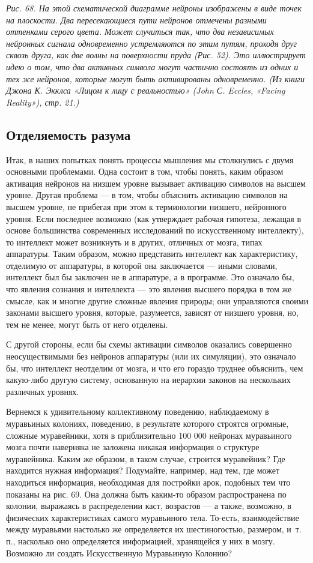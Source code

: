 \documentclass[../main.tex]{subfiles}
\begin{document}
\emph{Рис. 68. На этой схематической диаграмме нейроны изображены в виде точек на плоскости. Два пересекающиеся пути нейронов отмечены разными оттенками серого цвета. Может случиться так, что два независимых нейронных сигнала одновременно устремляются по этим путям, проходя друг сквозь друга, как две волны на поверхности пруда (Рис. 52). Это иллюстрирует идею о том, что два активных символа могут частично состоять из одних и тех же нейронов, которые могут быть активированы одновременно. (Из книги Джона К. Экклса «Лицом к лицу с реальностью» (John С. Eccles, «Facing Reality»), стр. 21.)}

\subsection{Отделяемость разума}

Итак, в наших попытках понять процессы мышления мы столкнулись с двумя основными проблемами. Одна состоит в том, чтобы понять, каким образом активация нейронов на низшем уровне вызывает активацию символов на высшем уровне. Другая проблема --- в том, чтобы объяснить активацию символов на высшем уровне, не прибегая при этом к терминологии низшего, нейронного уровня. Если последнее возможно (как утверждает рабочая гипотеза, лежащая в основе большинства современных исследований по искусственному интеллекту), то интеллект может возникнуть и в других, отличных от мозга, типах аппаратуры. Таким образом, можно представить интеллект как характеристику, отделимую от аппаратуры, в которой она заключается --- иными словами, интеллект был бы заключен не в аппаратуре, а в программе. Это означало бы, что явления сознания и интеллекта --- это явления высшего порядка в том же смысле, как и многие другие сложные явления природы; они управляются своими законами высшего уровня, которые, разумеется, зависят от низшего уровня, но, тем не менее, могут быть от него отделены.

С другой стороны, если бы схемы активации символов оказались совершенно неосуществимыми без нейронов аппаратуры (или их симуляции), это означало бы, что интеллект неотделим от мозга, и что его гораздо труднее объяснить, чем какую-либо другую систему, основанную на иерархии законов на нескольких различных уровнях.

Вернемся к удивительному коллективному поведению, наблюдаемому в муравьиных колониях, поведению, в результате которого строятся огромные, сложные муравейники, хотя в приблизительно 100 000 нейронах муравьиного мозга почти наверняка не заложена никакая информация о структуре муравейника. Каким же образом, в таком случае, строится муравейник? Где находится нужная информация? Подумайте, например, над тем, где может находиться информация, необходимая для постройки арок, подобных тем что показаны на рис. 69. Она должна быть каким-то образом распространена по колонии, выражаясь в распределении каст, возрастов --- а также, возможно, в физических характеристиках самого муравьиного тела. То-есть, взаимодействие между муравьями настолько же определяется их шестиногостью, размером, и~т.\,п., насколько оно определяется информацией, хранящейся у них в мозгу. Возможно ли создать Искусственную Муравьиную Колонию?
\end{document}
